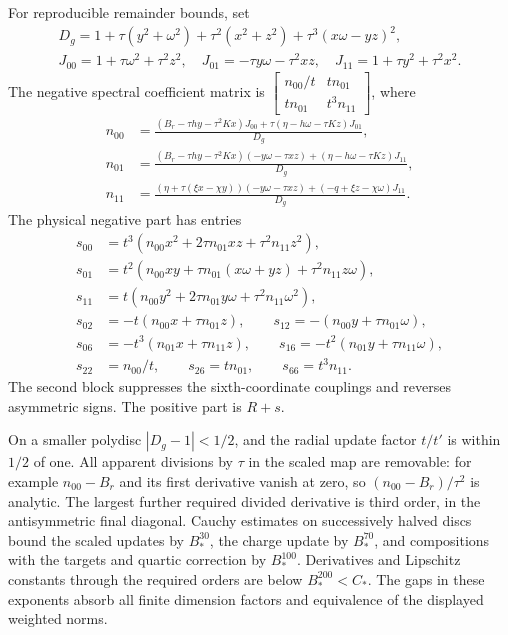 \documentclass[11pt]{article}
\theoremstyle{remark}\newtheorem{remark}[theorem]{Remark}
\numberwithin{equation}{section}
\begin{document}
For reproducible remainder bounds, set
\begin{gather*}
 D_g=1+\tau(y^2+\omega^2)+\tau^2(x^2+z^2)+\tau^3(x\omega-yz)^2,\\
 J_{00}=1+\tau\omega^2+\tau^2z^2,\quad
 J_{01}=-\tau y\omega-\tau^2xz,\quad
 J_{11}=1+\tau y^2+\tau^2x^2.
\end{gather*}
The negative spectral coefficient matrix is
$\left[\begin{smallmatrix}n_{00}/t&tn_{01}\\tn_{01}&t^3n_{11}\end{smallmatrix}\right]$, where
\begin{align*}
 n_{00}&=\frac{(B_r-\tau hy-\tau^2Kx)J_{00}
       +\tau(\eta-h\omega-\tau Kz)J_{01}}{D_g},\\
 n_{01}&=\frac{(B_r-\tau hy-\tau^2Kx)(-y\omega-\tau xz)
       +(\eta-h\omega-\tau Kz)J_{11}}{D_g},\\
 n_{11}&=\frac{(\eta+\tau(\xi x-\chi y))(-y\omega-\tau xz)
       +(-q+\xi z-\chi\omega)J_{11}}{D_g}.
\end{align*}
The physical negative part has entries
\begin{align*}
 s_{00}&=t^3(n_{00}x^2+2\tau n_{01}xz+\tau^2n_{11}z^2),\\
 s_{01}&=t^2(n_{00}xy+\tau n_{01}(x\omega+yz)+\tau^2n_{11}z\omega),\\
 s_{11}&=t(n_{00}y^2+2\tau n_{01}y\omega+\tau^2n_{11}\omega^2),\\
 s_{02}&=-t(n_{00}x+\tau n_{01}z),\qquad
 s_{12}=-(n_{00}y+\tau n_{01}\omega),\\
 s_{06}&=-t^3(n_{01}x+\tau n_{11}z),\qquad
 s_{16}=-t^2(n_{01}y+\tau n_{11}\omega),\\
 s_{22}&=n_{00}/t,\qquad s_{26}=tn_{01},\qquad s_{66}=t^3n_{11}.
\end{align*}
The second block suppresses the sixth-coordinate couplings and reverses asymmetric signs. The positive part is $R+s$.

On a smaller polydisc $|D_g-1|<1/2$, and the radial update factor $t/t'$ is within $1/2$ of one. All apparent divisions by $\tau$ in the scaled map are removable: for example $n_{00}-B_r$ and its first derivative vanish at zero, so $(n_{00}-B_r)/\tau^2$ is analytic. The largest further required divided derivative is third order, in the antisymmetric final diagonal. Cauchy estimates on successively halved discs bound the scaled updates by $B_*^{30}$, the charge update by $B_*^{70}$, and compositions with the targets and quartic correction by $B_*^{100}$. Derivatives and Lipschitz constants through the required orders are below $B_*^{200}<C_*$. The gaps in these exponents absorb all finite dimension factors and equivalence of the displayed weighted norms.
\end{document}
